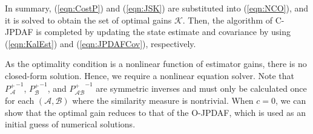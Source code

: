 \documentclass[10pt]{article}
\newcommand{\refeqn}[1]{(\ref{eqn:#1})}
\theoremstyle{plain}\theorembodyfont{\normalfont}
\begin{document}
In summary, \refeqn{CostP} and \refeqn{JSK} are substituted into \refeqn{NCO}, and it is solved to obtain the set of optimal gains $\mathcal{K}$. Then, the algorithm of C-JPDAF is completed by updating the state estimate and covariance by using \refeqn{KalEst} and \refeqn{JPDAFCov}, respectively.


As the optimality condition is a nonlinear function of estimator gains, there is no closed-form solution. Hence, we require a nonlinear equation solver. Note that ${P_\mathcal{A}^+}^{-1}$, ${P_\mathcal{B}^+}^{-1}$, and ${P_{\mathcal{A}\mathcal{B}}^+}^{-1}$ are symmetric inverses and must only be calculated once for each $(\mathcal{A},\mathcal{B})$ where the similarity measure is nontrivial. When $c=0$, we can show that the optimal gain reduces to that of the O-JPDAF, which is used as an initial guess of numerical solutions.
\end{document}
